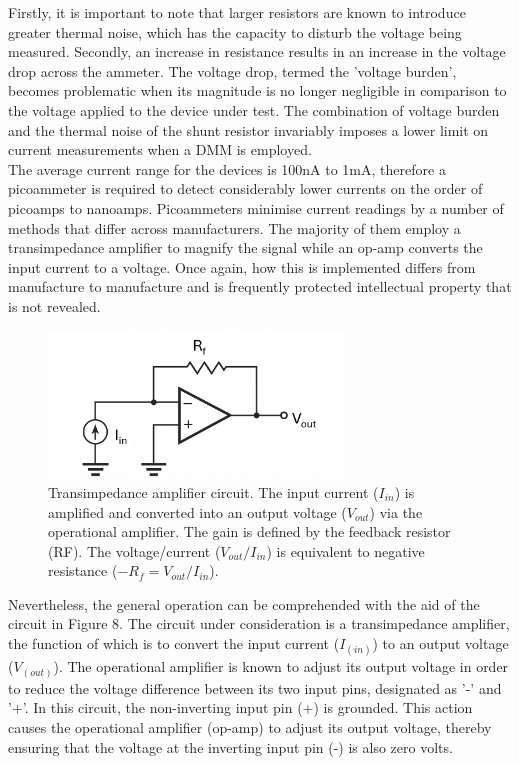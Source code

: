 \noindent Firstly, it is important to note that larger resistors are known to introduce greater thermal noise, which has the capacity to disturb the voltage being measured. Secondly, an increase in resistance results in an increase in the voltage drop across the ammeter. The voltage drop, termed the 'voltage burden', becomes problematic when its magnitude is no longer negligible in comparison to the voltage applied to the device under test. The combination of voltage burden and the thermal noise of the shunt resistor invariably imposes a lower limit on current measurements when a DMM is employed. \\

\noindent The average current range for the devices is 100nA to 1mA, therefore a picoammeter is required to detect considerably lower currents on the order of picoamps to nanoamps. Picoammeters minimise current readings by a number of methods that differ across manufacturers. The majority of them employ a transimpedance amplifier to magnify the signal while an op-amp converts the input current to a voltage. Once again, how this is implemented differs from manufacture to manufacture and is frequently protected intellectual property that is not revealed. \\

\begin{figure}[htbp!] 
    \centering    
    \includegraphics[width=0.7\textwidth]{Chapter3/Figs/e.png}
    \caption[Transimpedance amplifier circuit.]{Transimpedance amplifier circuit. The input current ($I_{in}$) is amplified and converted into an output voltage ($V_{out}$) via the operational amplifier. The gain is defined by the feedback resistor (RF). The voltage/current ($V_{out}/I_{in}$) is equivalent to negative resistance ($-R_f = V_{out} / I_{in}$).}
    \label{fig:3e}
\end{figure}

\noindent Nevertheless, the general operation can be comprehended with the aid of the circuit in Figure 8. The circuit under consideration is a transimpedance amplifier, the function of which is to convert the input current ($I_(in)$) to an output voltage ($V_(out)$). The operational amplifier is known to adjust its output voltage in order to reduce the voltage difference between its two input pins, designated as '-' and '+'. In this circuit, the non-inverting input pin (+) is grounded. This action causes the operational amplifier (op-amp) to adjust its output voltage, thereby ensuring that the voltage at the inverting input pin (-) is also zero volts. \\

